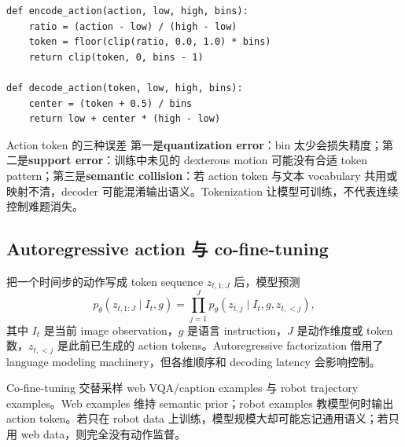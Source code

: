 

\begin{lstlisting}[caption={连续动作与 action token 的概念转换}]
def encode_action(action, low, high, bins):
    ratio = (action - low) / (high - low)
    token = floor(clip(ratio, 0.0, 1.0) * bins)
    return clip(token, 0, bins - 1)

def decode_action(token, low, high, bins):
    center = (token + 0.5) / bins
    return low + center * (high - low)
\end{lstlisting}

\begin{warningbox}{Action token 的三种误差}
第一是\textbf{quantization error}：bin 太少会损失精度；第二是\textbf{support error}：训练中未见的 dexterous motion 可能没有合适 token pattern；第三是\textbf{semantic collision}：若 action token 与文本 vocabulary 共用或映射不清，decoder 可能混淆输出语义。Tokenization 让模型可训练，不代表连续控制难题消失。
\end{warningbox}

\subsection{Autoregressive action 与 co-fine-tuning}

把一个时间步的动作写成 token sequence $z_{t,1:J}$ 后，模型预测
$$
p_\theta(z_{t,1:J}\mid I_t,g)
=\prod_{j=1}^{J}p_\theta(z_{t,j}\mid I_t,g,z_{t,<j}),
$$
其中 $I_t$ 是当前 image observation，$g$ 是语言 instruction，$J$ 是动作维度或 token 数，$z_{t,<j}$ 是此前已生成的 action tokens。Autoregressive factorization 借用了 language modeling machinery，但各维顺序和 decoding latency 会影响控制。

Co-fine-tuning 交替采样 web VQA/caption examples 与 robot trajectory examples。Web examples 维持 semantic prior；robot examples 教模型何时输出 action token。若只在 robot data 上训练，模型规模大却可能忘记通用语义；若只用 web data，则完全没有动作监督。



